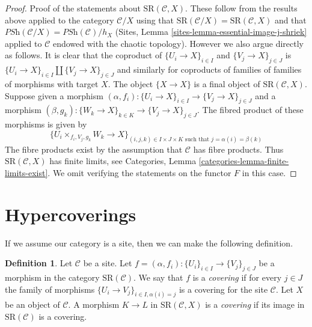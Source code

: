 \documentclass{stacks-project}
\theoremstyle{plain}
\theoremstyle{definition}
\newtheorem{definition}[subsection]{Definition}
\theoremstyle{remark}
\numberwithin{equation}{subsection}
\begin{document}
\begin{proof}
\medskip\noindent
Proof of the statements about $\text{SR}(\mathcal{C}, X)$.
These follow from the results above applied to the category
$\mathcal{C}/X$ using that
$\text{SR}(\mathcal{C}/X) = \text{SR}(\mathcal{C}, X)$ and that
$\textit{PSh}(\mathcal{C}/X) = \textit{PSh}(\mathcal{C})/h_X$
(Sites, Lemma \ref{sites-lemma-essential-image-j-shriek} applied
to $\mathcal{C}$ endowed with the chaotic topology). However
we also argue directly as follows.
It is clear that the coproduct of
$\{U_i \to X\}_{i \in I}$ and $\{V_j \to X\}_{j \in J}$
is $\{U_i \to X\}_{i \in I} \amalg \{V_j \to X\}_{j \in J}$
and similarly for coproducts of
families of families of morphisms with target $X$.
The object $\{X \to X\}$ is a final
object of $\text{SR}(\mathcal{C}, X)$.
Suppose given a morphism
$(\alpha, f_i) : \{U_i \to X\}_{i \in I} \to \{V_j \to X\}_{j \in J}$
and a morphism
$(\beta, g_k) : \{W_k \to X\}_{k \in K} \to \{V_j \to X\}_{j \in J}$.
The fibred product of these morphisms is given by
$$
\{ U_i \times_{f_i, V_j, g_k} W_k \to X \}_{(i, j, k) \in I \times J \times K
\text{ such that } j = \alpha(i) = \beta(k)}
$$
The fibre products exist by the assumption that
$\mathcal{C}$ has fibre products.
Thus $\text{SR}(\mathcal{C}, X)$ has finite limits,
see Categories, Lemma \ref{categories-lemma-finite-limits-exist}.
We omit verifying the statements on the functor $F$ in this case.
\end{proof}





\section{Hypercoverings}
\label{section-hypercoverings}

\noindent
If we assume our category is a site, then we can make the following
definition.

\begin{definition}
\label{definition-covering-SR}
Let $\mathcal{C}$ be a site. Let
$f = (\alpha, f_i) : \{U_i\}_{i \in I} \to \{V_j\}_{j \in J}$
be a morphism in the category $\text{SR}(\mathcal{C})$.
We say that $f$ is a {\it covering} if for every $j \in J$ the
family of morphisms $\{U_i \to V_j\}_{i \in I, \alpha(i) = j}$
is a covering for the site $\mathcal{C}$.
Let $X$ be an object of $\mathcal{C}$.
A morphism $K \to L$ in $\text{SR}(\mathcal{C}, X)$ is
a {\it covering} if its image in $\text{SR}(\mathcal{C})$ is
a covering.
\end{definition}
\end{document}
